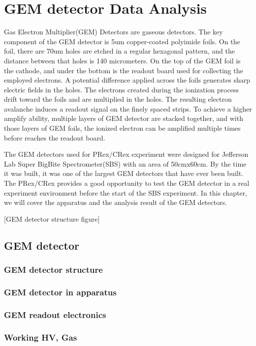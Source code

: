 \chapter{GEM detector Data Analysis}

Gas Electron Multiplier(GEM) Detectors are gaseous detectors. The key component of the GEM detector is 5um copper-coated polyimide foils. On the foil, there are 70um holes are etched in a regular hexagonal pattern, and the distance between that holes is 140 micrometers. On the top of the GEM foil is the cathode, and under the bottom is the readout board used for collecting the employed electrons. A potential difference applied across the foils generates sharp electric fields in the holes. The electrons created during the ionization process drift toward the foils and are multiplied in the holes. The resulting electron avalanche induces a readout signal on the finely spaced strips. To achieve a higher amplify ability, multiple layers of GEM detector are stacked together, and with those layers of GEM foils, the ionized electron can be amplified multiple times before reaches the readout board. 

The GEM detectors used for PRex/CRex experiment were designed for Jefferson Lab Super BigBite Spectrometer(SBS) with an area of 50cmx60cm. By the time it was built, it was one of the largest GEM detectors that have ever been built. The PRex/CRex provides a good opportunity to test the GEM detector in a real experiment environment before the start of the SBS experiment. In this chapter, we will cover the apparatus and the analysis result of the GEM detectors. 

[GEM detector structure figure]



\section{GEM detector}
\subsection{GEM detector structure}
\subsection{GEM detector in apparatus}
\subsection{GEM readout electronics}
\subsection{Working HV, Gas}

